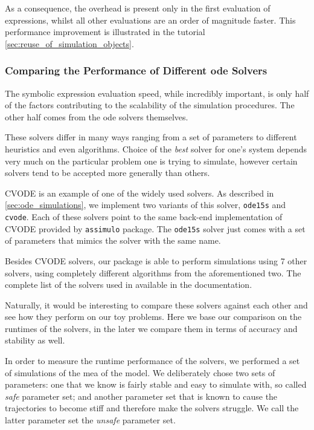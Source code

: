 As a consequence, the overhead is present only in the first evaluation of expressions, whilst all other evaluations are an order of magnitude faster.
This performance improvement is illustrated in the tutorial \autoref{sec:reuse_of_simulation_objects}.

\subsubsection{Comparing the Performance of Different \gls{ode} Solvers}

The symbolic expression evaluation speed, while incredibly important, is only half of the factors contributing to the scalability of the simulation procedures. 
The other half comes from the \gls{ode} solvers themselves.

These solvers differ in many ways ranging from a set of parameters to
different heuristics and even algorithms. 
Choice of the \emph{best} solver for one's  system depends very much on the particular problem one is trying to simulate, however certain solvers tend to be accepted more generally than others.

CVODE is an example of one of the widely used solvers. As described in \autoref{sec:ode_simulations}, we implement two variants of this solver, \verb#ode15s# and \verb#cvode#.
Each of these solvers point to the same back-end implementation of CVODE provided by \verb#assimulo# package. The \verb#ode15s# solver just comes with a set of parameters that mimics the \mat{} solver with the same name.

Besides CVODE solvers, our package is able to perform simulations using 7 other solvers, using completely different algorithms from the aforementioned two.
The complete list of the solvers used in available in the documentation. 
 
Naturally, it would be interesting to compare these solvers against each other and see how they perform on our toy problems. 
Here we base our comparison on the runtimes of the solvers, in the later  we compare them in terms of accuracy and stability as well.

In order to measure the runtime performance of the solvers, we performed a set of simulations of the \acrlong{mea} of the \pft{} model. 
We deliberately chose two sets of parameters: one that we know is fairly stable and easy to simulate with, so called \emph{safe} parameter set; and another parameter set that is known to cause the trajectories to become stiff and therefore make the solvers struggle. We call the latter parameter set the \emph{unsafe} parameter set.
 
